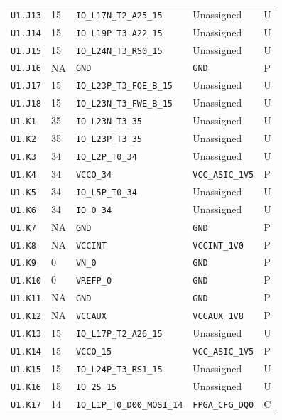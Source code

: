 \documentclass[11pt,a4paper]{article}
\begin{document}
\begin{longtable}{@{}P{20mm}P{10mm}P{75mm}P{49mm}P{7mm}@{}}
\nolinkurl{U1.J13} & 15 & \nolinkurl{IO_L17N_T2_A25_15} & Unassigned & U \\
\nolinkurl{U1.J14} & 15 & \nolinkurl{IO_L19P_T3_A22_15} & Unassigned & U \\
\nolinkurl{U1.J15} & 15 & \nolinkurl{IO_L24N_T3_RS0_15} & Unassigned & U \\
\nolinkurl{U1.J16} & NA & \nolinkurl{GND} & \nolinkurl{GND} & P \\
\nolinkurl{U1.J17} & 15 & \nolinkurl{IO_L23P_T3_FOE_B_15} & Unassigned & U \\
\nolinkurl{U1.J18} & 15 & \nolinkurl{IO_L23N_T3_FWE_B_15} & Unassigned & U \\
\nolinkurl{U1.K1} & 35 & \nolinkurl{IO_L23N_T3_35} & Unassigned & U \\
\nolinkurl{U1.K2} & 35 & \nolinkurl{IO_L23P_T3_35} & Unassigned & U \\
\nolinkurl{U1.K3} & 34 & \nolinkurl{IO_L2P_T0_34} & Unassigned & U \\
\nolinkurl{U1.K4} & 34 & \nolinkurl{VCCO_34} & \nolinkurl{VCC_ASIC_1V5} & P \\
\nolinkurl{U1.K5} & 34 & \nolinkurl{IO_L5P_T0_34} & Unassigned & U \\
\nolinkurl{U1.K6} & 34 & \nolinkurl{IO_0_34} & Unassigned & U \\
\nolinkurl{U1.K7} & NA & \nolinkurl{GND} & \nolinkurl{GND} & P \\
\nolinkurl{U1.K8} & NA & \nolinkurl{VCCINT} & \nolinkurl{VCCINT_1V0} & P \\
\nolinkurl{U1.K9} & 0 & \nolinkurl{VN_0} & \nolinkurl{GND} & P \\
\nolinkurl{U1.K10} & 0 & \nolinkurl{VREFP_0} & \nolinkurl{GND} & P \\
\nolinkurl{U1.K11} & NA & \nolinkurl{GND} & \nolinkurl{GND} & P \\
\nolinkurl{U1.K12} & NA & \nolinkurl{VCCAUX} & \nolinkurl{VCCAUX_1V8} & P \\
\nolinkurl{U1.K13} & 15 & \nolinkurl{IO_L17P_T2_A26_15} & Unassigned & U \\
\nolinkurl{U1.K14} & 15 & \nolinkurl{VCCO_15} & \nolinkurl{VCC_ASIC_1V5} & P \\
\nolinkurl{U1.K15} & 15 & \nolinkurl{IO_L24P_T3_RS1_15} & Unassigned & U \\
\nolinkurl{U1.K16} & 15 & \nolinkurl{IO_25_15} & Unassigned & U \\
\nolinkurl{U1.K17} & 14 & \nolinkurl{IO_L1P_T0_D00_MOSI_14} & \nolinkurl{FPGA_CFG_DQ0} & C \\

\end{longtable}
\end{document}
